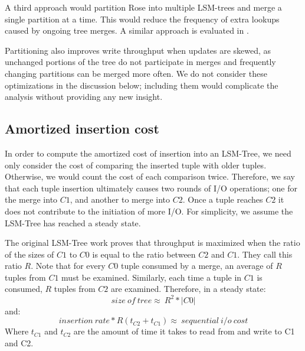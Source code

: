 \documentclass{vldb}
\newcommand{\rows}{Rose\xspace}
\begin{document}

A third approach would partition \rows into multiple LSM-trees and
merge a single partition at a time.  This would reduce the frequency
of extra lookups caused by ongoing tree merges.  A similar approach is
evaluated in \cite{partexp}.

Partitioning also improves write throughput when updates are skewed,
as unchanged portions of the tree do not participate in merges and
frequently changing partitions can be merged more often.  We do not
consider these optimizations in the discussion below; including them
would complicate the analysis without providing any new insight.

\subsection{Amortized insertion cost}

In order to compute the amortized cost of insertion into an LSM-Tree,
we need only consider the cost of comparing the inserted tuple with
older tuples.  Otherwise, we would count the cost of each comparison
twice.  Therefore, we say that each tuple insertion ultimately causes
two rounds of I/O operations; one for the merge into $C1$, and another
to merge into $C2$.  Once a tuple reaches $C2$ it does not contribute
to the initiation of more I/O.  For simplicity, we assume the LSM-Tree
has reached a steady state.

The original LSM-Tree work proves that throughput
is maximized when the ratio of the sizes of $C1$ to $C0$ is equal to
the ratio between $C2$ and $C1$.  They call this ratio $R$.  Note that
for every $C0$ tuple consumed by a
merge, an average of $R$ tuples from $C1$ must be examined.  Similarly, each time a
tuple in $C1$ is consumed, $R$ tuples from $C2$ are examined.
Therefore, in a steady state:
\[size~of~tree\approx~R^2*|C0|\]
and:
\[insertion~rate*R(t_{C2}+t_{C1})\approx~sequential~i/o~cost\]
Where $t_{C1}$ and $t_{C2}$ are the amount of time it takes to read
from and write to C1 and C2.
\end{document}
